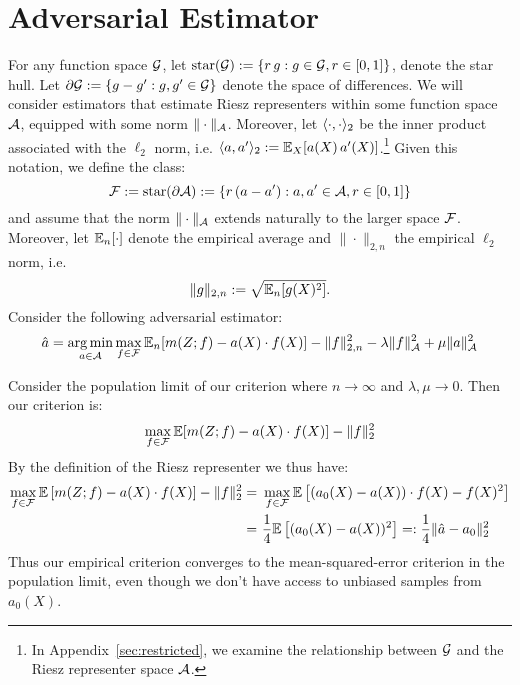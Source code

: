 \section{Adversarial Estimator}

For any function space ${\mathcal G}$, let $\text{star}({\mathcal G}):=\{r\, g: g\in {\mathcal G}, r \in [0, 1]\}$, denote the star hull. Let $\partial {\mathcal G}:= \{g-g': g, g'\in {\mathcal G}\}$ denote the space of differences. We will consider estimators that estimate Riesz representers within some function space ${\mathcal A}$, equipped with some norm $\|\cdot\|_{{\mathcal A}}$. Moreover, let $\langle \cdot, \cdot \rangle_2$ be the inner product associated with the $\ell_2$ norm, i.e. $\langle a, a' \rangle_2 := \mathbb{E}_{X}[a(X)\, a'(X)]$.\footnote{In Appendix~\ref{sec:restricted}, we examine the relationship between ${\mathcal G}$ and the Riesz representer space ${\mathcal A}$.} Given this notation, we define the class:
\begin{equation}
{\mathcal F}:=\text{star}(\partial{\mathcal A}):=\{r\, (a-a'): a, a'\in {\mathcal A}, r\in [0,1]\}    
\end{equation}
and assume that the norm $\|\cdot\|_{{\mathcal A}}$ extends naturally to the larger space ${\mathcal F}$. Moreover, let $\mathbb{E}_n[\cdot]$ denote the empirical average and $\|\cdot\|_{2,n}$ the empirical $\ell_2$ norm, i.e. 
$$\|g\|_{2,n} :=\sqrt{\mathbb{E}_n[g(X)^2]}.$$
Consider the following adversarial estimator:
\begin{equation}\label{eqn:reg-estimator}
    \hat{a} = \operatorname*{arg\,min}_{a\in {\mathcal A}} \max_{f\in {\mathcal F}} \mathbb{E}_n[m(Z; f) - a(X)\cdot f(X)] - \|f\|_{2,n}^2 - \lambda \|f\|_{{\mathcal A}}^2 + \mu \|a\|_{{\mathcal A}}^2
\end{equation}

\begin{remark}
Consider the population limit of our criterion where $n\to \infty$ and $\lambda,\mu \to 0$. Then our criterion is:
\begin{equation}
    \max_{f\in {\mathcal F}} \mathbb{E}[m(Z; f) - a(X)\cdot f(X)] - \|f\|_{2}^2
\end{equation}
By the definition of the Riesz representer we thus have:
\begin{align}
    \max_{f\in {\mathcal F}} \mathbb{E}\left[m(Z; f) - a(X)\cdot f(X)\right] - \|f\|_{2}^2 =~& \max_{f\in {\mathcal F}} \mathbb{E}\left[(a_0(X) - a(X))\cdot f(X) -  f(X)^2\right]\\
    =~& \frac{1}{4}\mathbb{E}\left[(a_0(X) - a(X))^2\right] =: \frac{1}{4} \|\hat{a}-a_0\|_2^2
\end{align}
Thus our empirical criterion converges to the mean-squared-error criterion in the population limit, even though we don't have access to unbiased samples from $a_0(X)$.
\end{remark}

